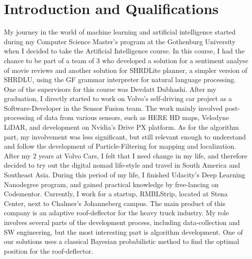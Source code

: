 \documentclass[12pt]{article}
\begin{document}
\maketitle

\section*{Introduction and Qualifications}
My journey in the world of machine learning and artificial intelligence started during my Computer Science Master's program at the Gothenburg University when I decided to take the Artificial Intelligence course. In this course, I had the chance to be part of a team of 3 who developed a solution for a sentiment analyse of movie reviews and another solution for SHRDLite planner, a simpler version of SHRDLU\cite{win1970shrdlu}, using the GF\cite{gf} grammar interpreter for natural language processing. One of the supervisors for this course was Devdatt Dubhashi.
After my graduation, I directly started to work on Volvo's self-driving car project as a Software-Developer in the Sensor Fusion team. The work mainly involved post-processing of data from various sensors, such as HERE HD maps, Velodyne LiDAR, and development on Nvidia's Drive PX platform. As for the algorithm part, my involvement was less significant, but still relevant enough to understand and follow the development of Particle-Filtering for mapping and localization.
After my 2 years at Volvo Cars, I felt that I need change in my life, and therefore decided to try out the digital nomad life-style and travel in South America and Southeast Asia. During this period of my life, I finished Udacity's Deep Learning Nanodegree program, and gained practical knowledge by free-lancing on Codementor.
Currently, I work for a startup, RMBLStrip, located at Stena Center, next to Chalmer's Johanneberg campus. The main product of this company is an adaptive roof-deflector for the heavy truck industry. My role involves several parts of the development process, including data-collection and SW engineering, but the most interesting part is algorithm development. One of our solutions uses a classical Bayesian probabilistic method to find the optimal position for the roof-deflector.
\end{document}
